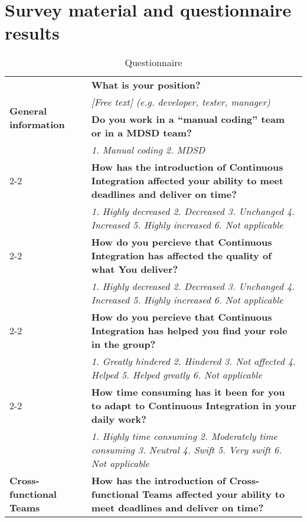 \documentclass[final_report_innit.tex]{subfiles}
\begin{document}
\section{Survey material and questionnaire results}\label{appendixSurvey}
\begin{center}
\begin{table}[h]
\caption{Questionnaire}
\label{tableQuest}
\begin{tabular}[t]{| p{4.5cm} | p{13cm} |}
	\hline
	\multirow{4}{*}{\textbf{General information}} & \cellcolor{greyOdd}\textbf{What is your position?} \\
	& \textit{[Free text] (e.g. developer, tester, manager)} \\ \cline{2-2}
	& \cellcolor{greyOdd}\textbf{Do you work in a ``manual coding'' team or in a MDSD team?} \\
	& \textit{1. Manual coding 2. MDSD} \\ \cline{2-2}
	\hline
	\multirow{9}{*}{\textbf{Continuous Integration}} & \cellcolor{greyOdd}\textbf{How has the introduction of Continuous Integration affected your ability to meet deadlines and deliver on time?} \\ 
	& \textit{1. Highly decreased 2. Decreased 3. Unchanged 4. Increased 5. Highly increased 6. Not applicable} \\ \cline{2-2}
	& \cellcolor{greyOdd}\textbf{How do you percieve that Continuous Integration has affected the quality of what You deliver?} \\
	& \textit{1. Highly decreased 2. Decreased 3. Unchanged 4. Increased 5. Highly increased 6. Not applicable} \\ \cline{2-2}
	& \cellcolor{greyOdd}\textbf{How do you percieve that Continuous Integration has helped you find your role in the group?} \\
	& \textit{1. Greatly hindered 2. Hindered 3. Not affected 4. Helped 5. Helped greatly 6. Not applicable} \\ \cline{2-2}
	& \cellcolor{greyOdd}\textbf{How time consuming has it been for you to adapt to Continuous Integration in your daily work?} \\
	& \textit{1. Highly time consuming 2. Moderately time consuming 3. Neutral 4. Swift 5. Very swift 6. Not applicable} \\
	\hline
	\multirow{9}{*}{\textbf{Cross-functional Teams}} & \cellcolor{greyOdd}\textbf{How has the introduction of Cross-functional Teams affected your ability to meet deadlines and deliver on time?} \\ 

\end{tabular}
\end{table}
\end{center}
\end{document}
